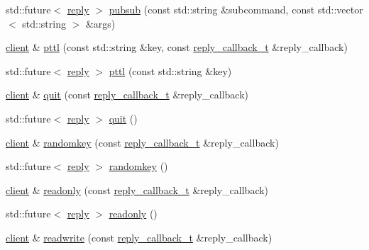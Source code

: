 \begin{DoxyCompactItemize}
\item 
std\+::future$<$ \hyperlink{classcpp__redis_1_1reply}{reply} $>$ \hyperlink{classcpp__redis_1_1client_a9f5ae4ef589038af3f7e8304a56446e2}{pubsub} (const std\+::string \&subcommand, const std\+::vector$<$ std\+::string $>$ \&args)
\item 
\hyperlink{classcpp__redis_1_1client}{client} \& \hyperlink{classcpp__redis_1_1client_a2f10778d114d8144416b09645a7c6416}{pttl} (const std\+::string \&key, const \hyperlink{classcpp__redis_1_1client_a061a1140d36d2eaeda82b09a0bb3f9f2}{reply\+\_\+callback\+\_\+t} \&reply\+\_\+callback)
\item 
std\+::future$<$ \hyperlink{classcpp__redis_1_1reply}{reply} $>$ \hyperlink{classcpp__redis_1_1client_adf173046c5866f6a9b9cd297a79b3028}{pttl} (const std\+::string \&key)
\item 
\hyperlink{classcpp__redis_1_1client}{client} \& \hyperlink{classcpp__redis_1_1client_a455952961bd95a22630d1bd6c6a3f7a7}{quit} (const \hyperlink{classcpp__redis_1_1client_a061a1140d36d2eaeda82b09a0bb3f9f2}{reply\+\_\+callback\+\_\+t} \&reply\+\_\+callback)
\item 
std\+::future$<$ \hyperlink{classcpp__redis_1_1reply}{reply} $>$ \hyperlink{classcpp__redis_1_1client_a0b13beda169ce74720abf4bba2d69d68}{quit} ()
\item 
\hyperlink{classcpp__redis_1_1client}{client} \& \hyperlink{classcpp__redis_1_1client_a7ec81f685738479307e464db273201e6}{randomkey} (const \hyperlink{classcpp__redis_1_1client_a061a1140d36d2eaeda82b09a0bb3f9f2}{reply\+\_\+callback\+\_\+t} \&reply\+\_\+callback)
\item 
std\+::future$<$ \hyperlink{classcpp__redis_1_1reply}{reply} $>$ \hyperlink{classcpp__redis_1_1client_a021538472ad199d7a203a77af6aba96c}{randomkey} ()
\item 
\hyperlink{classcpp__redis_1_1client}{client} \& \hyperlink{classcpp__redis_1_1client_a14353780458071311d074fd951201f93}{readonly} (const \hyperlink{classcpp__redis_1_1client_a061a1140d36d2eaeda82b09a0bb3f9f2}{reply\+\_\+callback\+\_\+t} \&reply\+\_\+callback)
\item 
std\+::future$<$ \hyperlink{classcpp__redis_1_1reply}{reply} $>$ \hyperlink{classcpp__redis_1_1client_acbf4ef53964a7e451793c17b9ac103ee}{readonly} ()
\item 
\hyperlink{classcpp__redis_1_1client}{client} \& \hyperlink{classcpp__redis_1_1client_a0a9bfe5e6ec4ccbaf2b633dedc55a581}{readwrite} (const \hyperlink{classcpp__redis_1_1client_a061a1140d36d2eaeda82b09a0bb3f9f2}{reply\+\_\+callback\+\_\+t} \&reply\+\_\+callback)

\end{DoxyCompactItemize}
